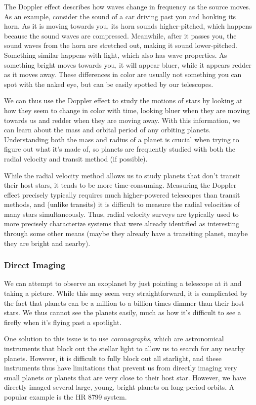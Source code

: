 The Doppler effect describes how waves change in frequency as the source moves.  As an example, consider the sound of a car driving past you and honking its horn.  As it is moving towards you, its horn sounds higher-pitched, which happens because the sound waves are compressed.  Meanwhile, after it passes you, the sound waves from the horn are stretched out, making it sound lower-pitched.  Something similar happens with light, which also has wave properties.  As something bright moves towards you, it will appear bluer, while it appears redder as it moves away. These differences in color are usually not something you can spot with the naked eye, but can be easily spotted by our telescopes.  

We can thus use the Doppler effect to study the motions of stars by looking at how they seem to change in color with time, looking bluer when they are moving towards us and redder when they are moving away.  With this information, we can learn about the mass and orbital period of any orbiting planets.  Understanding both the mass and radius of a planet is crucial when trying to figure out what it's made of, so planets are frequently studied with both the radial velocity and transit method (if possible).

While the radial velocity method allows us to study planets that don't transit their host stars, it tends to be more time-consuming.  Measuring the Doppler effect precisely typically requires much higher-powered telescopes than transit methods, and (unlike transits) it is difficult to measure the radial velocities of many stars simultaneously.  Thus, radial velocity surveys are typically used to more precisely characterize systems that were already identified as interesting through some other means (maybe they already have a transiting planet, maybe they are bright and nearby).


\subsubsection{Direct Imaging}
We can attempt to observe an exoplanet by just pointing a telescope at it and taking a picture.  While this may seem very straightforward, it is complicated by the fact that planets can be a million to a billion times dimmer than their host stars.  We thus cannot see the planets easily, much as how it’s difficult to see a firefly when it’s flying past a spotlight. 

One solution to this issue is to use \textit{coronagraphs}, which are astronomical instruments that block out the stellar light to allow us to search for any nearby planets.  However, it is difficult to fully block out all starlight, and these instruments thus have limitations that prevent us from directly imaging very small planets or planets that are very close to their host star.  However, we have directly imaged several large, young, bright planets on long-period orbits. A popular example is the HR 8799 system.

